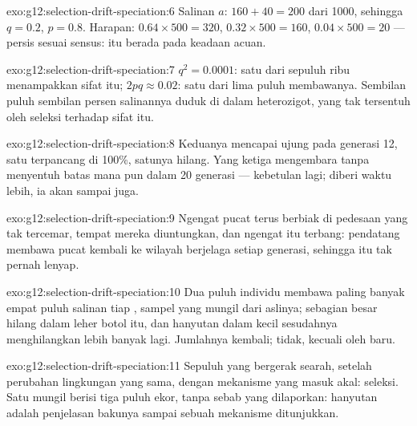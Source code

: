 \begin{solution}{exo:g12:selection-drift-speciation:6}
Salinan $a$: $160 + 40 = 200$ dari 1000, sehingga $q = 0.2$, $p = 0.8$.
Harapan: $0.64 \times 500 = 320$, $0.32 \times 500 = 160$, $0.04
\times 500 = 20$ --- persis sesuai sensus:  itu berada pada
keadaan acuan.
\end{solution}

\begin{solution}{exo:g12:selection-drift-speciation:7}
$q^2 = 0.0001$: satu dari sepuluh ribu menampakkan sifat itu; $2pq \approx
0.02$: satu dari lima puluh membawanya. Sembilan puluh sembilan persen
salinannya duduk di dalam heterozigot, yang tak tersentuh oleh seleksi
terhadap sifat itu.
\end{solution}

\begin{solution}{exo:g12:selection-drift-speciation:8}
Keduanya mencapai ujung pada generasi 12, satu terpancang di 100\%,
satunya hilang. Yang ketiga mengembara tanpa menyentuh batas mana pun
dalam 20 generasi --- kebetulan lagi; diberi waktu lebih, ia akan
sampai juga.
\end{solution}

\begin{solution}{exo:g12:selection-drift-speciation:9}
Ngengat pucat terus berbiak di pedesaan yang tak tercemar, tempat
mereka diuntungkan, dan ngengat itu terbang: pendatang membawa 
pucat kembali ke wilayah berjelaga setiap generasi, sehingga  itu
tak pernah lenyap.
\end{solution}

\begin{solution}{exo:g12:selection-drift-speciation:10}
Dua puluh individu membawa paling banyak empat puluh salinan tiap ,
sampel yang mungil dari  aslinya; sebagian besar hilang dalam
leher botol itu, dan hanyutan dalam  kecil sesudahnya
menghilangkan lebih banyak lagi. Jumlahnya kembali;  tidak,
kecuali oleh  baru.
\end{solution}

\begin{solution}{exo:g12:selection-drift-speciation:11}
Sepuluh  yang bergerak searah, setelah perubahan lingkungan
yang sama, dengan mekanisme yang masuk akal: seleksi. Satu 
mungil berisi tiga puluh ekor, tanpa sebab yang dilaporkan: hanyutan
adalah penjelasan bakunya sampai sebuah mekanisme ditunjukkan.
\end{solution}

